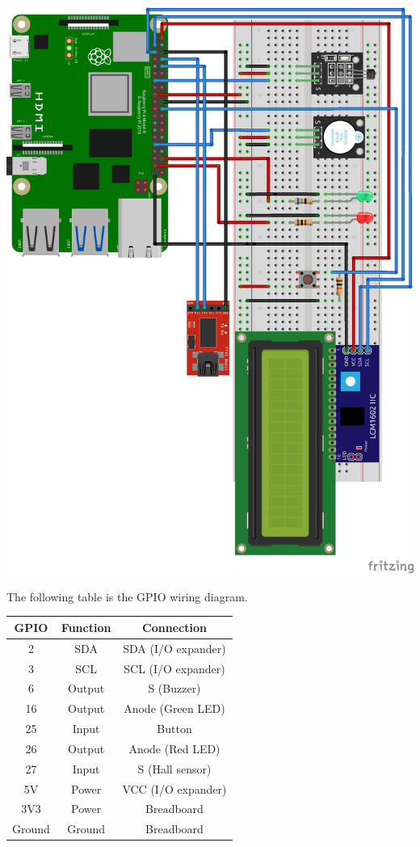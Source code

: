 \documentclass[]{article}
\begin{document}
\begin{center}
    \includegraphics[scale=0.9]{breadboard}
\end{center}

\newpage
The following table is the GPIO wiring diagram.

\begin{center}
    \begin{tabular}{ |c|c|c| } 
        \hline
        GPIO & Function & Connection \\
        \hline
        2 & SDA & SDA (I/O expander) \\
        3 & SCL & SCL (I/O expander) \\
        6 & Output & S (Buzzer) \\
        16 & Output & Anode (Green LED) \\
        25 & Input & Button \\
        26 & Output & Anode (Red LED) \\
        27 & Input & S (Hall sensor) \\
        5V & Power & VCC (I/O expander) \\
        3V3 & Power & Breadboard \\
        Ground & Ground & Breadboard \\
        \hline
    \end{tabular}
\end{center}
\end{document}
